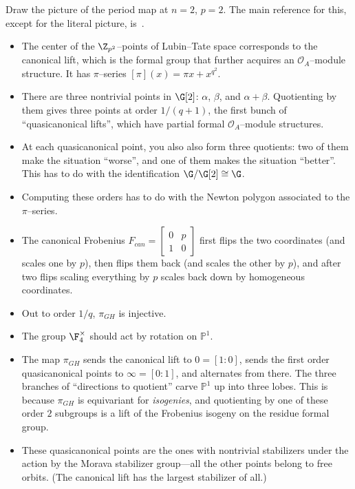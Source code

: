 Draw the picture of the period map at $n = 2$, $p = 2$.  The main reference for this, except for the literal picture, is~\cite[Appendix 25]{HopkinsGrossEquivVBs}.
\begin{itemize}
\item The center of the $\Z_{p^2}$--points of Lubin--Tate space corresponds to the canonical lift, which is the formal group that further acquires an $\mathcal O_A$--module structure.  It has $\pi$--series $[\pi](x) = \pi x + x^{q^2}$.
\item There are three nontrivial points in $\G[2]$: $\alpha$, $\beta$, and $\alpha + \beta$.  Quotienting by them gives three points at order $1/(q+1)$, the first bunch of ``quasicanonical lifts'', which have partial formal $\mathcal O_A$--module structures.
\item At each quasicanonical point, you also also form three quotients: two of them make the situation ``worse'', and one of them makes the situation ``better''.  This has to do with the identification $\G / \G[2] \cong \G$.
\item Computing these orders has to do with the Newton polygon associated to the $\pi$--series.
\item The canonical Frobenius $F_{can} = \left[ \begin{array}{cc} 0 & p \\ 1 & 0 \end{array} \right]$ first flips the two coordinates (and scales one by $p$), then flips them back (and scales the other by $p$), and after two flips scaling everything by $p$ scales back down by homogeneous coordinates.
\item Out to order $1/q$, $\pi_{GH}$ is injective.
\item The group $\F_4^\times$ should act by rotation on $\mathbb P^1$.
\item The map $\pi_{GH}$ sends the canonical lift to $0 = [1:0]$, sends the first order quasicanonical points to $\infty = [0:1]$, and alternates from there.  The three branches of ``directions to quotient'' carve $\mathbb P^1$ up into three lobes.  This is because $\pi_{GH}$ is equivariant for \emph{isogenies}, and quotienting by one of these order $2$ subgroups is a lift of the Frobenius isogeny on the residue formal group.
\item These quasicanonical points are the ones with nontrivial stabilizers under the action by the Morava stabilizer group---all the other points belong to free orbits.  (The canonical lift has the largest stabilizer of all.)
\end{itemize}


